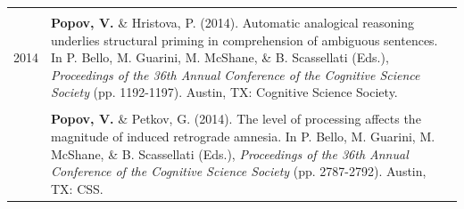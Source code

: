 \documentclass[letterpaper]{article}
\begin{document}
\begin{longtable}{p{0.7cm}p{15cm}}
  &                                                                                                                                                                                                                                                                                                                                                                        \\
  2014 & \textbf{Popov, V.} \& Hristova, P. (2014). Automatic analogical reasoning underlies structural priming in comprehension of ambiguous sentences. In P. Bello, M. Guarini, M. McShane, \& B. Scassellati (Eds.), {\it Proceedings of the 36th Annual Conference of the Cognitive Science Society} (pp. 1192-1197). Austin, TX: Cognitive Science Society.                \\[6pt]
  &                                                                                                                                                                                                                                                                                                                                                                        \\
  & \textbf{Popov, V.} \& Petkov, G. (2014). The level of processing affects the magnitude of induced retrograde amnesia. In P. Bello, M. Guarini, M. McShane, \& B. Scassellati (Eds.), {\it Proceedings of the 36th Annual Conference of the Cognitive Science Society} (pp. 2787-2792). Austin, TX: CSS.                                                                \\
\end{longtable}
\end{document}
